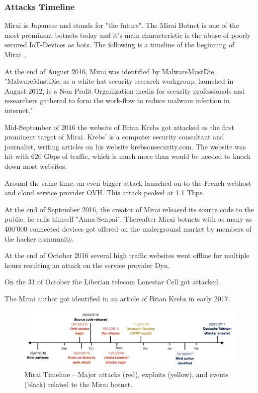 \subsubsection{Attacks Timeline}
Mirai is Japanese and stands for "the future".
The Mirai Botnet is one of the most prominent botnets today and it's main characteristic is the abuse of poorly secured IoT-Devices as bots.
The following is a timeline of the beginning of Mirai~\cite{Kolias17,Antonakakis17}.

At the end of August 2016, Mirai was identified by MalwareMustDie.
"MalwareMustDie, as a white-hat security research workgroup, launched in August 2012, is a Non Profit Organization media for security professionals and researchers gathered to form the work-flow to reduce malware infection in internet."\cite{MalwareMustDie}

Mid-September of 2016 the website of Brian Krebs got attacked as the first prominent target of Mirai.
Krebs' is a computer security consultant and journalist, writing articles on his website krebsonsecurity.com.
The website was hit with 620 Gbps of traffic, which is much more than would be needed to knock down most websites.\cite{Krebs16_2}

Around the same time, an even bigger attack launched on to the French webhost and cloud service provider OVH. This attack peaked at 1.1 Tbps.

At the end of September 2016, the creator of Mirai released its source code to the public, he calls himself "Anna-Senpai".
Thereafter Mirai botnets with as many as 400'000 connected devices got offered on the underground market by members of the hacker community.

At the end of October 2016 several high traffic websites went offline for multiple hours resulting an attack on the service provider Dyn.

On the 31 of October the Liberian telecom Lonestar Cell got attacked.

The Mirai author got identified in an article of Brian Krebs in early 2017.\cite{Krebs17}

\begin{figure}[ht]
\begin{center} \includegraphics[scale=0.35]{Talk11/mirai-timeline} \end{center}
\caption{Mirai Timeline -- Major attacks (red), exploits (yellow), and events (black) related to the Mirai botnet.\cite{Antonakakis17}}
\label{fig:timeline}
\end{figure}

